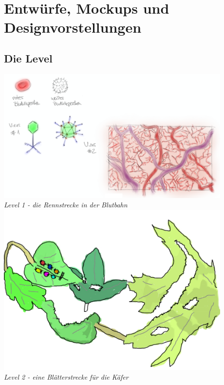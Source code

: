\newpage

\section{Entwürfe, Mockups und Designvorstellungen}

\subsection{Die Level}

\begin{flushright}

\includegraphics[width=0.88\textwidth]{img/blutlaufbahn.png}\\
\textit{Level 1 - die Rennstrecke in der Blutbahn}\\[3em]

\includegraphics[width=0.88\textwidth]{img/kaefer.png}\\
\textit{Level 2 - eine Blätterstrecke für die Käfer}

\newpage


\end{flushright}
